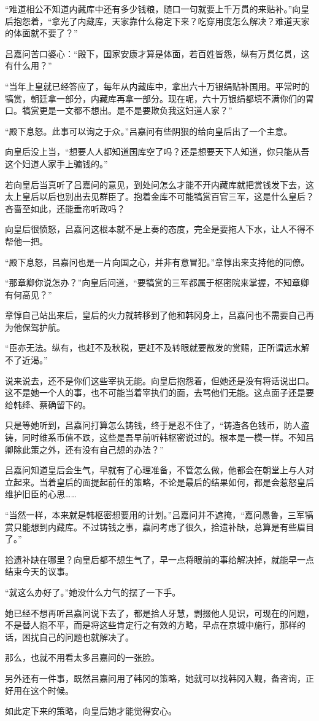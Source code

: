 “难道相公不知道内藏库中还有多少钱粮，随口一句就要上千万贯的来贴补。”向皇后抱怨着，“拿光了内藏库，天家靠什么稳定下来？吃穿用度怎么解决？难道天家的体面就不要了？”

吕嘉问苦口婆心：“殿下，国家安康才算是体面，若百姓皆怨，纵有万贯亿贯，这有什么用？”

“当年上皇就已经答应了，每年从内藏库中，拿出六十万银绢贴补国用。平常时的犒赏，朝廷拿一部分，内藏库再拿一部分。现在呢，六十万银绢都填不满你们的胃口。犒赏更是一文都不想出。是不是要欺负我这妇道人家？”

“殿下息怒。此事可以询之于众。”吕嘉问有些阴狠的给向皇后出了一个主意。

向皇后没上当，“想要人人都知道国库空了吗？还是想要天下人知道，你只能从吾这个妇道人家手上骗钱的。”

若向皇后当真听了吕嘉问的意见，到处问怎么才能不开内藏库就把赏钱发下去，这太上皇后以后也别出去见群臣了。抱着金库不可能犒赏百官三军，这是什么皇后？吝啬至如此，还能垂帘听政吗？

向皇后很愤怒，吕嘉问这根本就不是上奏的态度，完全是要拖人下水，让人不得不帮他一把。

“殿下息怒，吕嘉问也是一片向国之心，并非有意冒犯。”章惇出来支持他的同僚。

“那章卿你说怎办？”向皇后问道，“要犒赏的三军都属于枢密院来掌握，不知章卿有何高见？”

章惇自己站出来后，皇后的火力就转移到了他和韩冈身上，吕嘉问也不需要自己再为他保驾护航。

“臣亦无法。纵有，也赶不及秋税，更赶不及转眼就要散发的赏赐，正所谓远水解不了近渴。”

说来说去，还不是你们这些宰执无能。向皇后抱怨着，但她还是没有将话说出口。这不是她一个人的事，也不可能当着宰执们的面，去骂他们无能。这点面子还是要给韩绛、蔡确留下的。

只是等她听到，吕嘉问打算怎么铸钱，终于是忍不住了，“铸造各色钱币，防人盗铸，同时维系币值不跌，这些是吾早前听韩枢密说过的。根本是一模一样。不知吕卿除此策之外，还有没有自己想的办法？”

吕嘉问知道皇后会生气，早就有了心理准备，不管怎么做，他都会在朝堂上与人对立起来。当着皇后的面提起前任的策略，不论是最后的结果如何，都是会惹怒皇后维护旧臣的心思……

“当然一样，本来就是韩枢密想要用的计划。”吕嘉问并不遮掩，“嘉问愚鲁，三军犒赏只能想到内藏库。不过铸钱之事，嘉问考虑了很久，拾遗补缺，总算是有些眉目了。”

拾遗补缺在哪里？向皇后都不想生气了，早一点将眼前的事给解决掉，就能早一点结束今天的议事。

“就这么办好了。”她没什么力气的摆了一下手。

她已经不想再听吕嘉问说下去了，都是拾人牙慧，剽掇他人见识，可现在的问题，不是替人抱不平，而是将这些肯定行之有效的方略，早点在京城中施行，那样的话，困扰自己的问题也就解决了。

那么，也就不用看太多吕嘉问的一张脸。

另外还有一件事，既然吕嘉问用了韩冈的策略，她就可以找韩冈入觐，备咨询，正好用在这个时候。

如此定下来的策略，向皇后她才能觉得安心。

